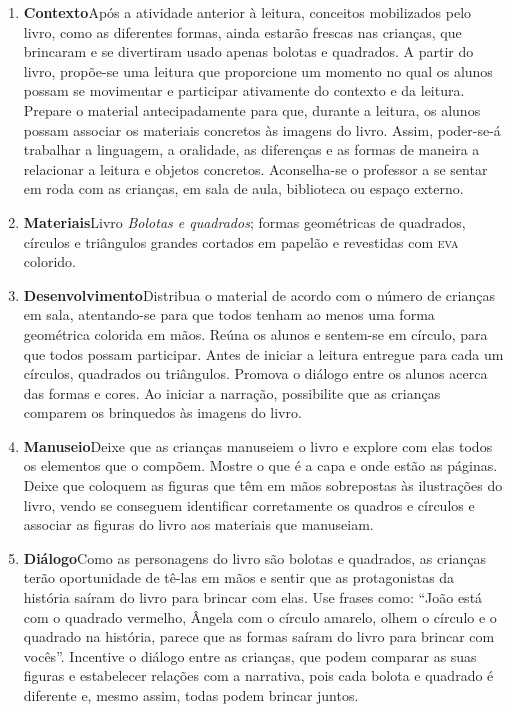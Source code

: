 \documentclass[11pt]{extarticle}
\begin{document}
\begin{enumerate}
\item \textbf{Contexto}\quad Após a atividade anterior à leitura, conceitos mobilizados pelo livro, como as diferentes formas, ainda estarão frescas nas crianças, que brincaram e se divertiram usado apenas bolotas e quadrados. A partir do livro, propõe-se uma leitura que  
proporcione um momento no qual os alunos possam se movimentar e participar ativamente do contexto e da leitura. Prepare o material antecipadamente para que, durante a leitura, os alunos possam associar os materiais concretos às imagens do livro.
Assim, poder-se-á trabalhar a linguagem, a oralidade, as diferenças e as formas de maneira a relacionar a leitura e objetos concretos. 
Aconselha-se o professor a se sentar em roda com as crianças, em sala de aula, biblioteca ou espaço externo.

\item \textbf{Materiais}\quad Livro \textit{Bolotas e quadrados}; formas geométricas de quadrados, círculos e triângulos grandes cortados em papelão e revestidas com \textsc{eva} colorido.


\item \textbf{Desenvolvimento}\quad Distribua o material de acordo com o número de crianças em sala, atentando-se para que todos tenham ao menos uma forma geométrica colorida em mãos. Reúna os alunos e sentem-se em círculo, para que todos possam participar. Antes de iniciar a leitura entregue para cada um círculos, quadrados ou triângulos. Promova o diálogo entre os alunos acerca das formas e cores. Ao iniciar a narração, possibilite que as crianças comparem os brinquedos às imagens do livro.
 
\item \textbf{Manuseio}\quad Deixe que as crianças manuseiem o livro 
e explore com elas todos os elementos que o compõem. Mostre o que é a 
capa e onde estão as páginas. Deixe que coloquem as figuras que têm em mãos sobrepostas às ilustrações do livro, vendo se conseguem identificar corretamente os quadros e círculos e associar as figuras do livro aos materiais que manuseiam.

\item \textbf{Diálogo}\quad Como as personagens do livro são bolotas e quadrados, as crianças terão oportunidade de tê-las em mãos e sentir que as protagonistas da história saíram do livro para brincar com elas. Use frases como: ``João está com o quadrado vermelho, Ângela com o círculo amarelo, olhem o círculo e o quadrado na história, parece que as formas saíram do livro para brincar com vocês''. Incentive o diálogo entre as crianças, que podem comparar as suas figuras e estabelecer relações com a narrativa, pois cada bolota e quadrado é diferente e, mesmo assim, todas podem brincar juntos.


\end{enumerate}
\end{document}
